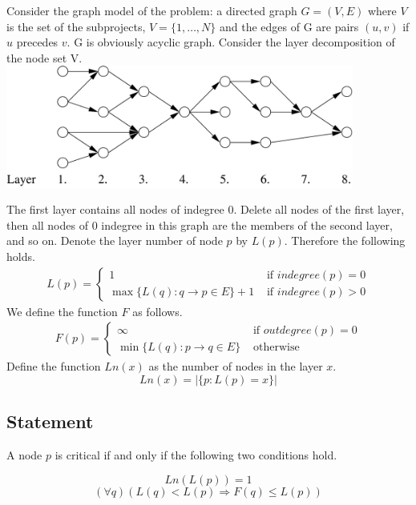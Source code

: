 
Consider the graph model of the problem: a directed graph $G=(V,E)$ where $V$ is the set of the subprojects, $V=\{1, \ldots ,N \} $ and the edges of G are pairs $(u,v)$ if $u$ precedes $v$.
G is obviously acyclic graph. Consider the layer decomposition of the node set V. \\
\includegraphics[height=4cm]{img/abra21.pdf}

The first layer contains all nodes of indegree 0. Delete all nodes of the first layer, then all nodes of  0 indegree in this graph are the members of the second layer, and so on.
Denote the layer number of node $p$ by $L(p)$. Therefore the following holds.
\begin{eqnarray}
L(p) = \left\{
\begin{array}{lll}
 1 & \textrm{ if } indegree(p)=0\\
 \max \{ L(q): q \rightarrow p \in E\} +1 & \textrm { if } indegree(p)>0
\end{array}\right.
\end{eqnarray}
We define the function $F$ as follows.
\begin{eqnarray}
F(p) = \left\{
\begin{array}{lll}
 \infty & \textrm{ if } outdegree(p)=0\\
 \min \{ L(q): p \rightarrow q \in E\} & \textrm { otherwise }
\end{array}\right.
\end{eqnarray}
Define the function $Ln(x)$ as the number of nodes in the layer $x$.
\[ Ln(x)= \vert \{p: L(p)=x \} \vert\]
\subsection*{Statement}
A node $p$ is critical if and only if the following two conditions hold.

\[ Ln(L(p))=1 \]
\[ (\forall q)(L(q)<L(p) \Rightarrow F(q) \leq L(p)) \]

